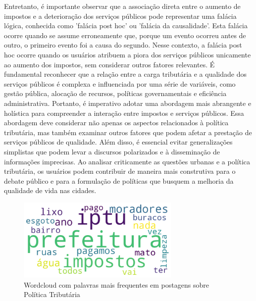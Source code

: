 Entretanto, é importante observar que a associação direta entre o aumento de impostos e a deterioração dos serviços públicos pode representar uma falácia lógica, conhecida como 'falácia post hoc' ou 'falácia da causalidade'. Esta falácia ocorre quando se assume erroneamente que, porque um evento ocorreu antes de outro, o primeiro evento foi a causa do segundo. Nesse contexto, a falácia post hoc ocorre quando os usuários atribuem a piora dos serviços públicos unicamente ao aumento dos impostos, sem considerar outros fatores relevantes. É fundamental reconhecer que a relação entre a carga tributária e a qualidade dos serviços públicos é complexa e influenciada por uma série de variáveis, como gestão pública, alocação de recursos, políticas governamentais e eficiência administrativa. Portanto, é imperativo adotar uma abordagem mais abrangente e holística para compreender a interação entre impostos e serviços públicos. Essa abordagem deve considerar não apenas os aspectos relacionados à política tributária, mas também examinar outros fatores que podem afetar a prestação de serviços públicos de qualidade. Além disso, é essencial evitar generalizações simplistas que podem levar a discursos polarizados e à disseminação de informações imprecisas. Ao analisar criticamente as questões urbanas e a política tributária, os usuários podem contribuir de maneira mais construtiva para o debate público e para a formulação de políticas que busquem a melhoria da qualidade de vida nas cidades.

\begin{figure}[htb]
	\centering
	\includegraphics[width=0.7\textwidth]{images/wordcloud_taxes.png}
	\caption{Wordcloud com palavras mais frequentes em postagens sobre Política Tributária}
	\label{fig:wordcloud_taxes}
\end{figure}

